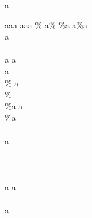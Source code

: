 a



 
	
% 
aaa %
aaa %
\%%
a\%%
\%a%
a\%a%
\\%
a\\%
\\a%
a\\a%
\\\%%
a\\\%%
\\\%a%
a\\\%a%
\\\\%
a\\\\%
\\\\a%
a\\\\a%
